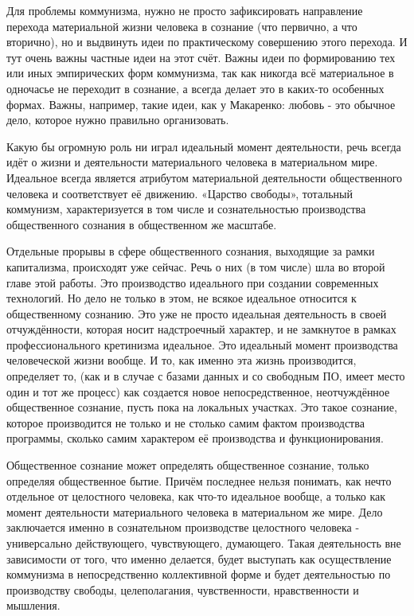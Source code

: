 \documentclass[12pt,a4paper,openany]{book}
\begin{document}
Для проблемы коммунизма, нужно не просто зафиксировать направление перехода материальной жизни человека в сознание (что первично, а что вторично), но и выдвинуть идеи по практическому совершению этого перехода. И тут очень важны частные идеи на этот счёт. Важны идеи по формированию тех или иных эмпирических форм коммунизма, так как никогда всё материальное в одночасье не переходит в сознание, а всегда делает это в каких-то особенных формах. Важны, например, такие идеи, как у Макаренко: любовь - это обычное дело, которое нужно правильно организовать.

Какую бы огромную роль ни играл идеальный момент деятельности, речь всегда идёт о жизни и деятельности материального человека в материальном мире. Идеальное всегда является атрибутом материальной деятельности общественного человека и соответствует её движению. «Царство свободы», тотальный коммунизм, характеризуется в том числе и сознательностью производства общественного сознания в общественном же масштабе.

Отдельные прорывы в сфере общественного сознания, выходящие за рамки капитализма, происходят уже сейчас. Речь о них (в том числе) шла во второй главе этой работы. Это производство идеального при создании современных технологий. Но дело не только в этом, не всякое идеальное относится к общественному сознанию. Это уже не просто идеальная деятельность в своей отчуждённости, которая носит надстроечный характер, и не замкнутое в рамках профессионального кретинизма идеальное. Это идеальный момент производства человеческой жизни вообще. И то, как именно эта жизнь производится, определяет то, (как и в случае с базами данных и со свободным ПО, имеет место один и тот же процесс) как создается новое непосредственное, неотчуждённое общественное сознание, пусть пока на локальных участках. Это такое сознание, которое производится не только и не столько самим фактом производства программы, сколько самим характером её производства и функционирования.

Общественное сознание может определять общественное сознание, только определяя общественное бытие. Причём последнее нельзя понимать, как нечто отдельное от целостного человека, как что-то идеальное вообще, а только как момент деятельности материального человека в материальном же мире. Дело заключается именно в сознательном производстве целостного человека - универсально действующего, чувствующего, думающего. Такая деятельность вне зависимости от того, что именно делается, будет выступать как осуществление коммунизма в непосредственно коллективной форме и будет деятельностью по производству свободы, целеполагания, чувственности, нравственности и мышления.
\end{document}
